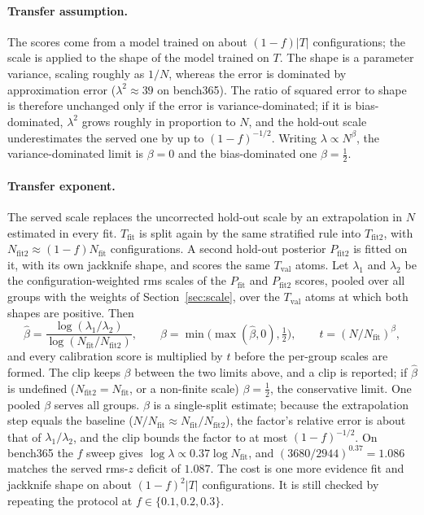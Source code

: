 \documentclass[11pt,a4paper]{article}
\begin{document}
\paragraph{Transfer assumption.} The scores come from a model trained on about $(1-f)|T|$
configurations; the scale is applied to the shape of the model trained on $T$. The shape is a
parameter variance, scaling roughly as $1/N$, whereas the error is dominated by approximation
error ($\lambda^2\approx39$ on bench365). The ratio of squared error to shape is therefore
unchanged only if the error is variance-dominated; if it is bias-dominated, $\lambda^2$ grows
roughly in proportion to $N$, and the hold-out scale underestimates the served one by up to
$(1-f)^{-1/2}$. Writing $\lambda\propto N^{\beta}$, the variance-dominated limit is $\beta=0$ and
the bias-dominated one $\beta=\tfrac12$.

\paragraph{Transfer exponent.} The served scale replaces the uncorrected hold-out scale by an
extrapolation in $N$ estimated in every fit. $T_{\mathrm{fit}}$ is split again by the same
stratified rule into $T_{\mathrm{fit2}}$, with $N_{\mathrm{fit2}}\approx(1-f)N_{\mathrm{fit}}$
configurations. A second hold-out posterior $P_{\mathrm{fit2}}$ is fitted on it, with its own
jackknife shape, and scores the same $T_{\mathrm{val}}$ atoms. Let $\lambda_1$ and $\lambda_2$ be
the configuration-weighted rms scales of the $P_{\mathrm{fit}}$ and $P_{\mathrm{fit2}}$ scores,
pooled over all groups with the weights of Section~\ref{sec:scale}, over the $T_{\mathrm{val}}$ atoms
at which both shapes are positive. Then
\[
  \hat\beta=\frac{\log(\lambda_1/\lambda_2)}{\log(N_{\mathrm{fit}}/N_{\mathrm{fit2}})},\qquad
  \beta=\min\bigl(\max(\hat\beta,0),\tfrac12\bigr),\qquad
  t=(N/N_{\mathrm{fit}})^{\beta},
\]
and every calibration score is multiplied by $t$ before the per-group scales are formed. The clip
keeps $\beta$ between the two limits above, and a clip is reported; if $\hat\beta$ is undefined
($N_{\mathrm{fit2}}=N_{\mathrm{fit}}$, or a non-finite scale) $\beta=\tfrac12$, the conservative
limit. One pooled $\beta$ serves all groups. $\beta$ is a single-split estimate; because the
extrapolation step equals the baseline ($N/N_{\mathrm{fit}}\approx N_{\mathrm{fit}}/N_{\mathrm{fit2}}$),
the factor's relative error is about that of $\lambda_1/\lambda_2$, and the clip bounds the factor
to at most $(1-f)^{-1/2}$. On bench365 the $f$ sweep gives $\log\lambda\propto0.37\log N_{\mathrm{fit}}$, and
$(3680/2944)^{0.37}=1.086$ matches the served rms-$z$ deficit of $1.087$. The cost is one more evidence fit and jackknife
shape on about $(1-f)^2|T|$ configurations. It is still checked by repeating the protocol at
$f\in\{0.1,0.2,0.3\}$.
\end{document}
